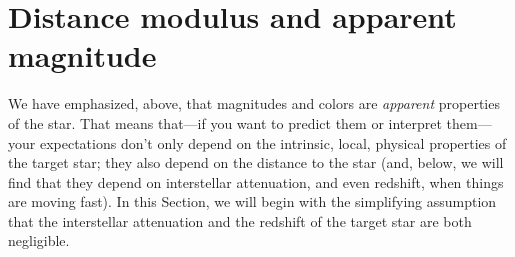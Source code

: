 \documentclass[10pt]{article}
\newcommand{\sectionname}{Section}
\begin{document}




\section{Distance modulus and apparent magnitude}

We have emphasized, above, that magnitudes and colors are \emph{apparent} properties of the star.
That means that---if you want to predict them or interpret them---your expectations don't only depend on the intrinsic, local, physical properties of the target star;
they also depend on the distance to the star (and, below, we will find that they depend on interstellar attenuation, and even redshift, when things are moving fast).
In this \sectionname{}, we will begin with the simplifying assumption that the interstellar attenuation and the redshift of the target star are both negligible.
\end{document}
